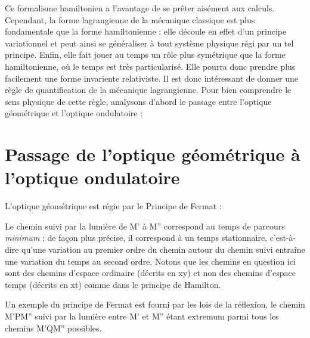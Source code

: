 Ce formalisme hamiltonien a l'avantage de se prêter aisément
aux calculs. Cependant, la forme lagrangienne de la mécanique classique
est plus fondamentale que la forme hamiltonienne : elle découle en effet
d'un principe variationnel et peut ainsi se généraliser à tout système
physique régi par un tel principe. Enfin, elle fait jouer au temps un
rôle plus symétrique que la forme hamiltonienne, où le temps est très
particularisé. Elle pourra donc prendre plus facilement une forme invariente relativiste.
Il est donc intéressant de donner une règle de quantification de la mécanique lagrangienne.
Pour bien comprendre le sens
physique de cette règle, analysons d'abord le passage entre l'optique
géométrique et l'optique ondulatoire :
\section{Passage de l'optique géométrique à l'optique ondulatoire}
L'optique géométrique est régie par le Principe de Fermat :

\begin{center}  \end{center}
 
Le chemin suivi par la lumière de M' à M'' correspond au
temps de parcours {\it minimum} ; de façon plus précise, il correspond à un
temps stationnaire, c'est-à-dire qu'une variation au premier ordre du
chemin autour du chemin suivi entraîne une variation du temps au second
ordre. Notons que les chemins en question ici sont des chemins d'espace
ordinaire (décrits en xy) et non des chemins d'espace temps (décrits en
xt) comme dans le principe de Hamilton.

Un exemple du principe de Fermat est fourni par les lois de
la réflexion, le chemin M'PM'' suivi par la lumière entre M' et M'' étant
extremum parmi tous les chemins M'QM'' possibles.

\begin{center}  \end{center}


